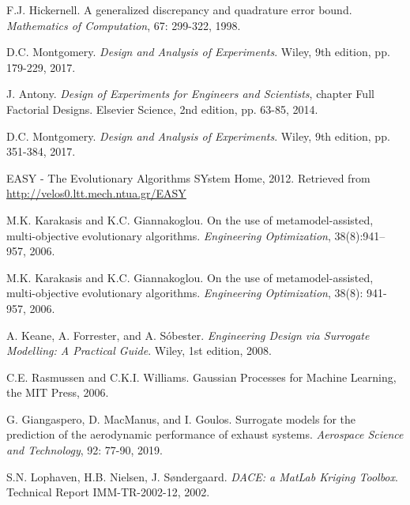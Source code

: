 \documentclass[twoside, 12pt,notitlepage]{report}
\begin{document}
\begin{thebibliography}{9}
F.J. Hickernell. A  generalized  discrepancy  and  quadrature  
error  bound. \textit{Mathematics of Computation}, 67: 299-322, 
1998.  

D.C. Montgomery. \textit{Design and Analysis of Experiments}. 
Wiley, 9th edition, pp. 179-229, 2017.


J. Antony. \textit{Design of Experiments for Engineers and 
Scientists}, chapter Full Factorial Designs. Elsevier 
Science, 2nd edition, pp. 63-85, 2014.

D.C. Montgomery. \textit{Design and Analysis of Experiments}. 
Wiley, 9th edition, pp. 351-384, 2017.

EASY - The Evolutionary Algorithms SYstem Home, 2012. 
Retrieved from \url{http://velos0.ltt.mech.ntua.gr/EASY}

M.K. Karakasis and K.C. Giannakoglou. On the use of 
metamodel-assisted, multi-objective evolutionary algorithms. 
\textit{Engineering Optimization}, 38(8):941–957, 2006.

M.K. Karakasis and K.C. Giannakoglou. On the use of 
metamodel-assisted, multi-objective evolutionary 
algorithms. \textit{Engineering Optimization}, 38(8): 
941-957, 2006.

A. Keane, A. Forrester, and A. Sóbester. 
\textit{Engineering Design via Surrogate Modelling: A 
Practical Guide}. Wiley, 1st edition, 2008.
  
C.E. Rasmussen and C.K.I. Williams. Gaussian Processes 
for Machine Learning, the MIT Press, 2006.
  
G. Giangaspero, D. MacManus, and I. Goulos. Surrogate 
models for the prediction of the aerodynamic performance 
of exhaust systems. \textit{Aerospace Science and 
Technology}, 92: 77-90, 2019.

S.N. Lophaven, H.B. Nielsen, J. Søndergaard. \textit{DACE: 
a MatLab Kriging Toolbox}. Technical Report IMM-TR-2002-12, 
2002.


\end{thebibliography}
\end{document}

